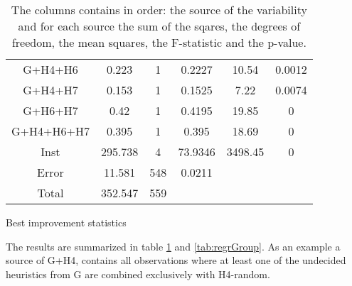 \documentclass[../main.tex]{subfiles}
\begin{document}
\begin{table}
\begin{adjustbox}{width=\columnwidth,center}
\begin{subtable}{.85\columnwidth}
\begin{tabular}{cccccc}
            G+H4+H6     & 0.223     & 1 & 0.2227    & 10.54 & 0.0012\\
            G+H4+H7     & 0.153     & 1 & 0.1525    & 7.22  & 0.0074\\
            G+H6+H7     & 0.42      & 1 & 0.4195    & 19.85 & 0     \\
            G+H4+H6+H7  & 0.395     & 1 & 0.395     & 18.69 & 0     \\
            Inst        & 295.738   & 4 & 73.9346   &3498.45& 0     \\
            Error       & 11.581    &548& 0.0211    &       &       \\
            Total       & 352.547   &559&           &       &       \\
            \hline
            \end{tabular}
        \caption{Best improvement statistics}
            \label{tab:anovaBestGroup}
        \end{subtable}
    \end{adjustbox}
    \label{tab:anovaGroup}
    \caption*{The columns contains in order: the source of the variability and for each source the sum of the sqares, the degrees of freedom, the mean squares, the F-statistic and the p-value.}
\end{table}

The results are summarized in table \ref{tab:anovaGroup} and \cref{tab:regrGroup}. 
As an example a source of G+H4, contains all observations where at least one of the undecided heuristics from G are combined exclusively with H4-random.
\end{document}
